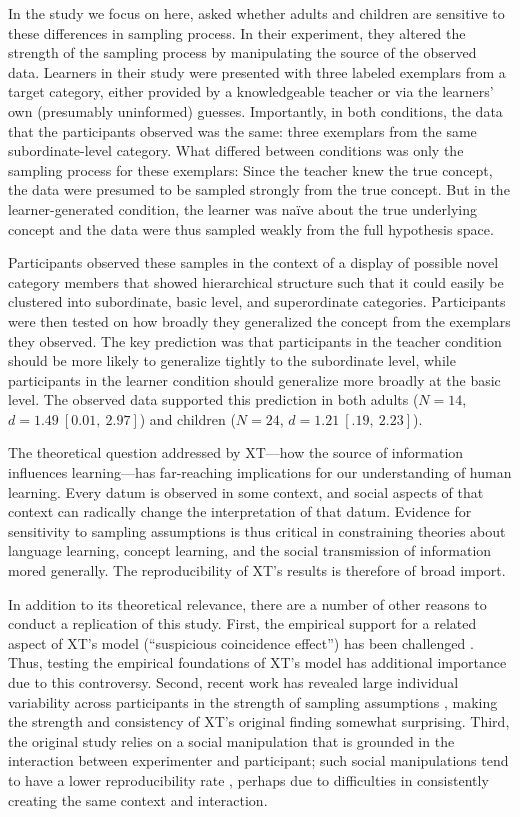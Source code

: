 \documentclass[man]{apa2}
\begin{document}
In the study we focus on here,  asked whether adults and children are sensitive to these differences in sampling process. In their experiment, they altered the strength of the sampling process by manipulating the source of the observed data. Learners in their study were presented with three labeled exemplars from a target category, either provided by a knowledgeable teacher or via the learners' own (presumably uninformed) guesses. Importantly, in both conditions, the data that the participants observed was the same: three exemplars from the same subordinate-level category. What differed between conditions was only the sampling process for these exemplars: Since the teacher knew the true concept, the data were presumed to be sampled strongly from the true concept. But in the learner-generated condition, the learner was na\"ive about the true underlying concept and the data were thus sampled weakly from the full hypothesis space. 

Participants observed these samples in the context of a display of possible novel category members that showed hierarchical structure such that it could easily be clustered into subordinate, basic level, and superordinate categories. Participants were then tested on how broadly they generalized the concept from the exemplars they observed. The key prediction was that participants in the teacher condition should be more likely to generalize tightly to the subordinate level, while participants in the learner condition should generalize more broadly at the basic level. The observed data supported this prediction in both adults ($N=14$, $d = 1.49\ [0.01,\ 2.97]$) and children ($N=24$, $d = 1.21\ [.19,\ 2.23]$).

The theoretical question addressed by XT---how the source of information influences learning---has far-reaching implications for our understanding of human learning. Every datum is observed in some context, and social aspects of that context can radically change the interpretation of that datum. Evidence for sensitivity to sampling assumptions is thus critical in constraining theories about language learning, concept learning, and the social transmission of information mored generally. The reproducibility of XT's results is therefore of broad import. 

In addition to its theoretical relevance, there are a number of other reasons to conduct a replication of this study. First, the empirical support for a related aspect of XT's model (``suspicious coincidence effect'')  has been challenged \cite{jenkins2015non,spencer2011}. Thus, testing the empirical foundations of XT's model has additional importance due to this controversy. Second, recent work has revealed large individual variability across participants in the strength of sampling assumptions \cite{navarro2012sampling}, making the strength and consistency of XT's original finding somewhat surprising. Third, the original study relies on a social manipulation that is grounded in the interaction between experimenter and participant; such social manipulations tend to have a lower reproducibility rate \cite{reproProj2015}, perhaps due to difficulties in consistently creating the same context and interaction. 
\end{document}
